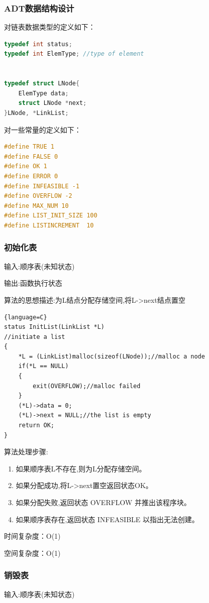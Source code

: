 \documentclass[supercite]{Experimental_Report}
\theoremstyle{definition}
\begin{document}
\clearpage
\subsubsection{ADT数据结构设计}
\noindent 对链表数据类型的定义如下：\par
\begin{lstlisting}[language=C] 
typedef int status;
typedef int ElemType; //type of element


typedef struct LNode{
	ElemType data;
	struct LNode *next;
}LNode, *LinkList;
\end{lstlisting}
对一些常量的定义如下：
\begin{lstlisting}[language=C] 
#define TRUE 1
#define FALSE 0
#define OK 1
#define ERROR 0
#define INFEASIBLE -1
#define OVERFLOW -2
#define MAX_NUM 10
#define LIST_INIT_SIZE 100
#define LISTINCREMENT  10
\end{lstlisting}

\subsubsection{初始化表}
输入:顺序表(未知状态)

输出:函数执行状态

算法的思想描述:为L结点分配存储空间,将L->next结点置空
\begin{lstlisting}{language=C}
status InitList(LinkList *L)
//initiate a list
{
	*L = (LinkList)malloc(sizeof(LNode));//malloc a node
	if(*L == NULL)
	{
		exit(OVERFLOW);//malloc failed
	}
	(*L)->data = 0;
	(*L)->next = NULL;//the list is empty
	return OK;
}
\end{lstlisting}
算法处理步骤:
\begin{enumerate}
	\renewcommand{\labelenumi}{\theenumi)}
	\item 如果顺序表L不存在,则为L分配存储空间。
	\item 如果分配成功,将L->next置空返回状态OK。
	\item 如果分配失败,返回状态 OVERFLOW 并推出该程序块。
	\item 如果顺序表存在,返回状态 INFEASIBLE 以指出无法创建。
\end{enumerate}

时间复杂度：O(1)

空间复杂度：O(1)

\subsubsection{销毁表}
输入:顺序表(未知状态)
\end{document}
